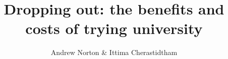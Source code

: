 \documentclass[FrontPage]{grattan}
\author{Andrew Norton \& Ittima Cherastidtham}
\title{Dropping out: the benefits and costs of trying university}
\begin{document}
    
    
    
    \contentspage
    
    \listoffigures
    
    
    
    
    
    
    
    
    

\appendix
    
    


\printbibliography
\end{document}
